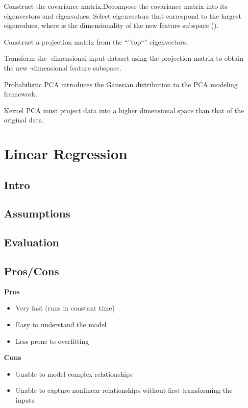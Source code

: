 \documentclass[]{book}
\theoremstyle{definition}
\theoremstyle{definition}
\theoremstyle{definition}
\theoremstyle{remark}
\begin{document}
Construct the covariance matrix.Decompose the covariance matrix into its
eigenvectors and eigenvalues. Select eigenvectors that correspond to the
largest eigenvalues, where is the dimensionality of the new feature
subspace ().

Construct a projection matrix from the ``''top``'' eigenvectors.

Transform the -dimensional input dataset using the projection matrix to
obtain the new -dimensional feature subspace.

Probabilistic PCA introduces the Gaussian distribution to the PCA
modeling framework.

Kernel PCA must project data into a higher dimensional space than that
of the original data.

\section{Linear Regression}\label{linear-regression}

\subsection{Intro}\label{intro-6}

\subsection{Assumptions}\label{assumptions-6}

\subsection{Evaluation}\label{evaluation-6}

\subsection{Pros/Cons}\label{proscons-6}

\textbf{Pros}

\begin{itemize}
\item
  Very fast (runs in constant time)
\item
  Easy to understand the model
\item
  Less prone to overfitting
\end{itemize}

\textbf{Cons}

\begin{itemize}
\item
  Unable to model complex relationships
\item
  Unable to capture nonlinear relationships without first transforming
  the inputs
\end{itemize}
\end{document}
